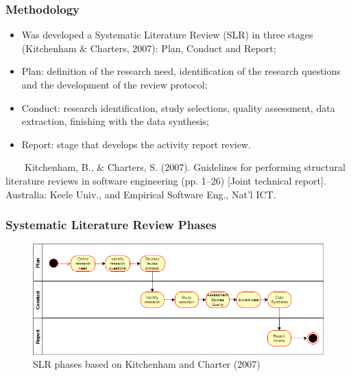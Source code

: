 \documentclass[10pt]{beamer}
\begin{document}
\begin{frame}
	\frametitle{Methodology}
	\begin{itemize}
		\item Was developed a Systematic Literature Review (SLR) in three stages \footnotesize(Kitchenham \& Charters, 2007)\normalsize: Plan, Conduct and Report;
		\item Plan: definition of the research need, identification of the research questions and the development of the review protocol;
		\item Conduct: research identification, study selections, quality assessment, data extraction, finishing with the data synthesis;
		\item Report: stage that develops the activity report review.
	\end{itemize}
	\tiny 
	~~~~Kitchenham, B., \& Charters, S. (2007). Guidelines for performing structural literature reviews in software engineering (pp. 1–26) [Joint technical report]. Australia: Keele Univ., and Empirical Software Eng., Nat’l ICT.\\

\end{frame}

\begin{frame}
	\frametitle{Systematic Literature Review Phases}
	\begin{figure}
		\includegraphics[scale=0.5]{../img/slr_phases.png}
		\caption{SLR phases based on Kitchenham and Charter (2007)}
		\label{figure1}
	\end{figure}
\end{frame}
\end{document}

